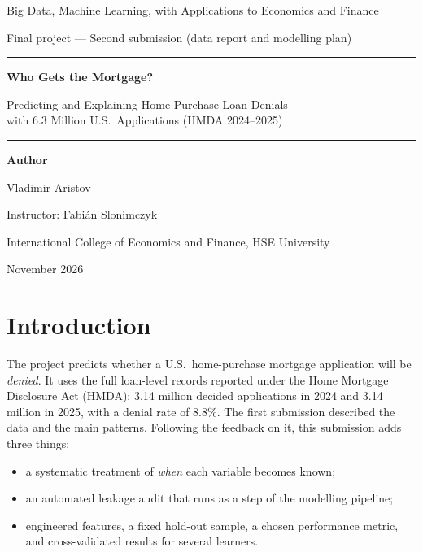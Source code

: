 \documentclass[11pt,a4paper]{article}
\newcommand{\pct}{\%}
\begin{document}
\begin{titlepage}
\centering
\vspace*{2.2cm}
{\large Big Data, Machine Learning, with Applications to Economics and Finance\par}
\vspace{0.3cm}
{\normalsize Final project --- Second submission (data report and modelling plan)\par}
\vspace{2.2cm}
\rule{\textwidth}{0.6pt}\par\vspace{0.5cm}
{\LARGE\bfseries Who Gets the Mortgage?\par}
\vspace{0.25cm}
{\Large Predicting and Explaining Home-Purchase Loan Denials\\ with 6.3 Million U.S.\ Applications (HMDA 2024--2025)\par}
\vspace{0.5cm}\rule{\textwidth}{0.6pt}\par
\vspace{2.2cm}
{\large\textbf{Author}\par}
\vspace{0.2cm}
{\large Vladimir Aristov\par}
\vspace{1.6cm}
{\normalsize Instructor: Fabián Slonimczyk\par}
\vspace{0.2cm}
{\normalsize International College of Economics and Finance, HSE University\par}
\vfill
{\normalsize November 2026\par}
\end{titlepage}

\section{Introduction}

The project predicts whether a U.S.\ home-purchase mortgage application will be
\emph{denied}. It uses the full loan-level records reported under the Home Mortgage
Disclosure Act (HMDA): 3.14 million decided applications in 2024 and 3.14 million in 2025,
with a denial rate of 8.8\pct. The first submission described the data and the main
patterns. Following the feedback on it, this submission adds three things:
\begin{itemize}
  \item a systematic treatment of \emph{when} each variable becomes known;
  \item an automated leakage audit that runs as a step of the modelling pipeline;
  \item engineered features, a fixed hold-out sample, a chosen performance metric, and
  cross-validated results for several learners.
\end{itemize}
\end{document}
